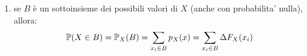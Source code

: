 {\begin{enumerate}
\begin{center}
  \end{center}
      Quindi $ F_X $ e' data dalla formula:
      \[
        F_X(x) = \sum_{x_i \in S_X.\ x_i \leq x} p_X(x_i),\quad \forall x \in \mathbb{R}
      \]
    \item se $B$ è un sottoinsieme dei possibili valori di $X$ (anche con probabilita' nulla), allora:
  \begin{equation}
    \P(X\in B) = \P_X(B) = \sum_{x_i\in B}p_X(x) = \sum_{x_i\in B}\Delta F_X(x_i)
  \end{equation}
  \end{enumerate}
}

